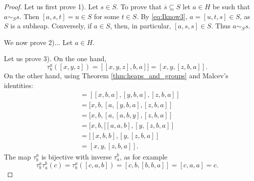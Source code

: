 \documentclass[graybox]{svmult}
\begin{document}
\begin{proof}
    Let us first prove 1). Let $s\in S$. To prove that 
    $\overline{s}\subseteq S$ let 
    $a\in H$ be such that $a\sim_Ss$. Then 
    $[a,s,t]=u\in S$ for some $t\in S$. By \eqref{eq:Iknow3}, 
    $a=[u,t,s]\in S$, as $S$ is a subheap. Conversely, 
    if $a\in S$, then, in particular, $[a,s,s]\in S$. Thus 
    $a\sim_Ss$. 

    We now prove 2)...
    Let $a\in H$. 

    Let us prove 3). On the one hand,
    \[
    \tau_b^a([x,y,z])=[[x,y,z],b,a]]=[x,y,[z,b,a]].
    \]
    On the other hand, using Theorem \ref{thm:heaps_and_groups}
    and Malcev's identities:
    \begin{align*}
        [\tau_b^a(x),\tau_b^a(y),\tau_b^a(z)] &= 
        [[x,b,a],[y,b,a],[z,b,a]]\\
        &=[x,b,[a,[y,b,a],[z,b,a]]\\
        &=[x,b,[a,[a,b,y],[z,b,a]]\\
        &=[x,b,[[a,a,b],[y,[z,b,a]]\\
        &=[[x,b,b],[y,[z,b,a]]\\
        &=[x,y,[z,b,a]].
    \end{align*}
    The map $\tau_b^a$ is bijective with inverse $\tau_a^b$, as
    for example
    \[
    \tau_b^a\tau_a^b(c)
    =\tau_b^a([c,a,b])=[c,b,[b,b,a]]=[c,a,a]=c.
    \]
\end{proof}




\end{document}
